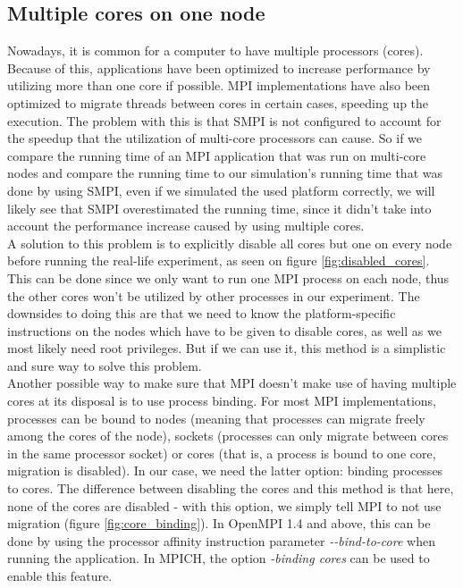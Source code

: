 \subsection{Multiple cores on one node}
\label{sec:multiple_cores}
Nowadays, it is common for a computer to have multiple processors
(cores). Because of this, applications have been optimized to increase
performance by utilizing more than one core if possible. MPI
implementations have also been optimized to migrate threads between
cores in certain cases, speeding up the execution. The problem with
this is that SMPI is not configured to account
for the speedup that the utilization of multi-core processors can
cause. So if we compare the running time of an MPI application that
was run on multi-core nodes and compare the running time to our
simulation's running time that was done by using SMPI, even if we
simulated the used platform correctly, we will likely see that SMPI
overestimated the running time, since it didn't take into account the
performance increase caused by using multiple cores.\\
A solution to this problem is to explicitly disable all cores
but one on every node before running the real-life experiment, as seen
on figure \ref{fig:disabled_cores}.\cite{ms11} This can be done since
we only want to run one MPI process on each node, thus the other cores
won't be utilized by other processes in our experiment. The downsides
to doing this are that we need to know the platform-specific
instructions on the nodes which have to be given to disable cores, as
well as we most likely need root privileges. But if we can use it,
this method is a simplistic and sure way to solve this problem.\\
Another possible way to make sure that MPI doesn't make use of having
multiple cores at its disposal is to use process binding. For most MPI
implementations, processes can be bound to nodes (meaning that
processes can migrate freely among the cores of the node), sockets
(processes can only migrate between cores in the same processor
socket) or cores (that is, a process is bound to one core, migration
is disabled). In our case, we need the latter option: binding
processes to cores. The difference between disabling the cores and
this method is that here, none of the cores are disabled - with this
option, we simply tell MPI to not use migration (figure
\ref{fig:core_binding}). In OpenMPI 1.4 and above, this can be done by
using the processor affinity instruction parameter
\emph{-{}-bind-to-core} when running the application. In MPICH,
the option \emph{-binding cores} can be used to enable this feature.
